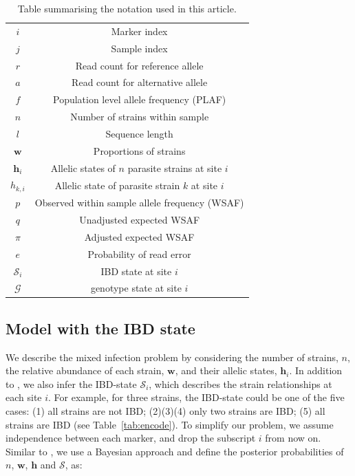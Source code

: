 \documentclass[9pt,lineno]{elife}
\begin{document}
\begin{table}[htb]\centering
\begin{tabular}{c|c}\hline
$i$              & Marker index\\
$j$              & Sample index \\
$r$              & Read count for reference allele \\
$a$              & Read count for alternative allele \\
$f$              & Population level allele frequency (PLAF) \\
$n$              & Number of strains within sample \\
$l$              & Sequence length \\
$\mathbf{w}$      & Proportions of strains \\
$\mathbf{h}_{i}$ & Allelic states of $n$ parasite strains at site $i$ \\
$h_{k,i}$   & Allelic state of parasite strain $k$ at site $i$\\
$p$              & Observed within sample allele frequency (WSAF) \\
$q$              & Unadjusted expected WSAF  \\
$\pi$            & Adjusted expected WSAF \\
$e$              & Probability of read error\\
$\mathcal{S}_{i}$ & IBD state at site $i$ \\
$\mathcal{G}$ & genotype state at site $i$ \\
\hline
\end{tabular}
\vspace{.2cm}
\caption{Table summarising the notation used in this article.}\label{tab:notation}
\end{table}

\subsection{Model with the IBD state}

We describe the mixed infection problem by considering the number of strains, $n$, the relative abundance of each strain, $\mathbf{w}$, and their allelic states, $\mathbf{h}_{i}$. In addition to \citet{Zhu2017}, we also infer the IBD-state $\mathcal{S}_{i}$, which describes the strain relationships at each site $i$. For example, for three strains, the IBD-state could be one of the five cases: (1) all strains are not IBD; (2)(3)(4) only two strains are IBD; (5) all strains are IBD (see Table~\ref{tab:encode}). To simplify our problem, we assume independence between each marker, and drop the subscript $i$ from now on. Similar to \citet{Jack2016}, we use a Bayesian approach and define the posterior probabilities of $n$, $\mathbf{w}$, $\mathbf{h}$ and $\mathcal{S}$,  as:
\end{document}
